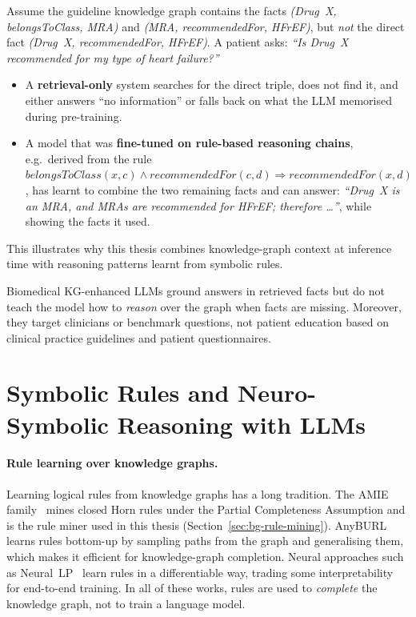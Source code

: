 \begin{bgexample}
Assume the guideline knowledge graph contains the facts
\emph{(Drug~X, belongsToClass, MRA)} and
\emph{(MRA, recommendedFor, HFrEF)}, but \emph{not} the direct fact
\emph{(Drug~X, recommendedFor, HFrEF)}. A patient asks:
\emph{``Is Drug~X recommended for my type of heart failure?''}
\begin{itemize}
  \item A \textbf{retrieval-only} system searches for the direct triple, does
        not find it, and either answers ``no information'' or falls back on
        what the LLM memorised during pre-training.
  \item A model that was \textbf{fine-tuned on rule-based reasoning chains},
        e.g.\ derived from the rule
        $\mathit{belongsToClass}(x,c) \wedge \mathit{recommendedFor}(c,d)
        \Rightarrow \mathit{recommendedFor}(x,d)$,
        has learnt to combine the two remaining facts and can answer:
        \emph{``Drug~X is an MRA, and MRAs are recommended for HFrEF;
        therefore \ldots''}, while showing the facts it used.
\end{itemize}
This illustrates why this thesis combines knowledge-graph context at
inference time with reasoning patterns learnt from symbolic rules.
\end{bgexample}

\begin{rwgap}
Biomedical KG-enhanced LLMs ground answers in retrieved facts but do not
teach the model how to \emph{reason} over the graph when facts are missing.
Moreover, they target clinicians or benchmark questions, not patient
education based on clinical practice guidelines and patient questionnaires.
\end{rwgap}

\section{Symbolic Rules and Neuro-Symbolic Reasoning with LLMs}
\label{sec:rw-nesy}

\paragraph{Rule learning over knowledge graphs.}
Learning logical rules from knowledge graphs has a long tradition. The AMIE
family~\cite{galarraga2013amie,galarraga2015fast,lajus2020fast} mines closed
Horn rules under the Partial Completeness Assumption and is the rule miner
used in this thesis (Section~\ref{sec:bg-rule-mining}). AnyBURL~\cite{meilicke2019anytime}
learns rules bottom-up by sampling paths from the graph and generalising them,
which makes it efficient for knowledge-graph completion. Neural approaches
such as Neural~LP~\cite{yang2017differentiable} learn rules in a
differentiable way, trading some interpretability for end-to-end training.
In all of these works, rules are used to \emph{complete} the knowledge graph,
not to train a language model.

